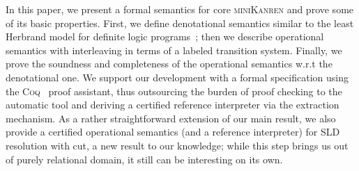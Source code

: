 In this paper, we present a formal semantics for core \textsc{miniKanren} and prove some of its basic properties. First,
we define denotational semantics similar to the least Herbrand model for definite logic programs~\cite{LHM}; then
we describe operational semantics with interleaving in terms of a labeled transition system. Finally, we prove the soundness and
completeness of the operational semantics w.r.t the denotational one. We support our development with a formal specification
using the \textsc{Coq}~\cite{Coq} proof assistant, thus outsourcing the burden of proof checking to the automatic tool and
deriving a certified reference interpreter via the extraction mechanism. As a rather straightforward extension of our
main result, we also provide a certified operational semantics (and a reference interpreter) for SLD resolution with cut, a new result
to our knowledge; while this step brings us out of purely relational domain, it still can be interesting on its own.
